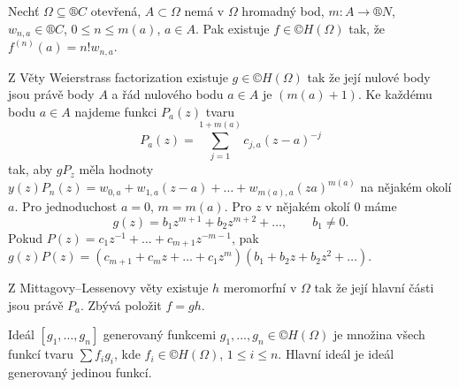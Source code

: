 \documentclass[12pt]{article}					%
\begin{document}
\begin{veta}
	Nechť $Ω \subseteq ®C$ otevřená, $A \subset Ω$ nemá v $Ω$ hromadný bod, $m: A \rightarrow ®N$, $w_{n, a} \in ®C$, $0 ≤ n ≤ m(a)$, $a \in A$. Pak existuje $f \in ©H(Ω)$ tak, že $f^{(n)}(a) = n!w_{n, a}$.

	\begin{dukazin}
		Z Věty Weierstrass factorization existuje $g \in ©H(Ω)$ tak že její nulové body jsou právě body $A$ a řád nulového bodu $a \in A$ je $(m(a) + 1)$. Ke každému bodu $a \in A$ najdeme funkci $P_a(z)$ tvaru
		$$ P_a(z) = \sum_{j=1}^{1 + m(a)} c_{j, a}(z - a)^{-j} $$
		tak, aby $gP_z$ měla hodnoty $y(z)P_n(z) = w_{0, a} + w_{1, a}(z - a) + … + w_{m(a), a}(za)^{m(a)}$ na nějakém okolí $a$. Pro jednoduchost $a = 0$, $m = m(a)$. Pro $z$ v nějakém okolí 0 máme
		$$ g(z) = b_1 z^{m+1} + b_2z^{m + 2} + …, \qquad b_1 ≠ 0. $$
		Pokud $P(z) = c_1 z^{-1} + … + c_{m+1}z^{-m-1}$, pak $g(z)P(z) = (c_{m+1} + c_m z + … + c_1z^m)(b_1 + b_2z + b_2z^2 + …)$.

		Z Mittagovy–Lessenovy věty existuje $h$ meromorfní v $Ω$ tak že její hlavní části jsou právě $P_a$. Zbývá položit $f = gh$.
	\end{dukazin}
\end{veta}

\begin{definice}
	Ideál $[g_1, …, g_n]$ generovaný funkcemi $g_1, …, g_n \in ©H(Ω)$ je množina všech funkcí tvaru $\sum f_i g_i$, kde $f_i \in ©H(Ω)$, $1 ≤ i ≤ n$. Hlavní ideál je ideál generovaný jedinou funkcí.
\end{definice}
\end{document}

